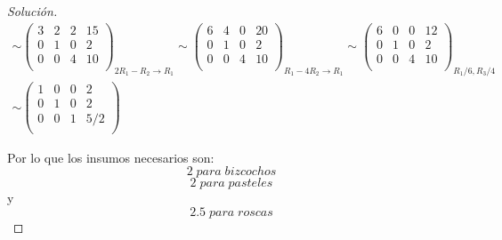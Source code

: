 \documentclass[12pt]{article}
\newenvironment{solution}{\begin{proof}[Solución]}{\end{proof}}
\begin{document}
\begin{enumerate}
\begin{solution}
\begin{gather*}
            \sim \left(\begin{array}{ccc|c}  
                3 & 2 & 2 & 15 \\  
                0 & 1 & 0 & 2  \\
                0 & 0 & 4 & 10 \\ 
            \end{array}\right)_{2R_1-R_2 \rightarrow R_1} \sim \left(\begin{array}{ccc|c}  
                6 & 4 & 0 & 20 \\  
                0 & 1 & 0 & 2  \\
                0 & 0 & 4 & 10 \\ 
            \end{array}\right)_{R_1-4R_2 \rightarrow R_1} \sim \left(\begin{array}{ccc|c}  
                6 & 0 & 0 & 12 \\  
                0 & 1 & 0 & 2  \\
                0 & 0 & 4 & 10 \\ 
            \end{array}\right)_{R_1/6, R_3/4} \\
            \sim \left(\begin{array}{ccc|c}  
                1 & 0 & 0 & 2 \\  
                0 & 1 & 0 & 2  \\
                0 & 0 & 1 & 5/2 \\ 
            \end{array}\right)
        \end{gather*}

        Por lo que los insumos necesarios son: \[2 \; para \; bizcochos\] \[2 \; para \; pasteles\] y \[2.5 \; para \;roscas\]

    \end{solution}
\end{enumerate}



\end{document}
